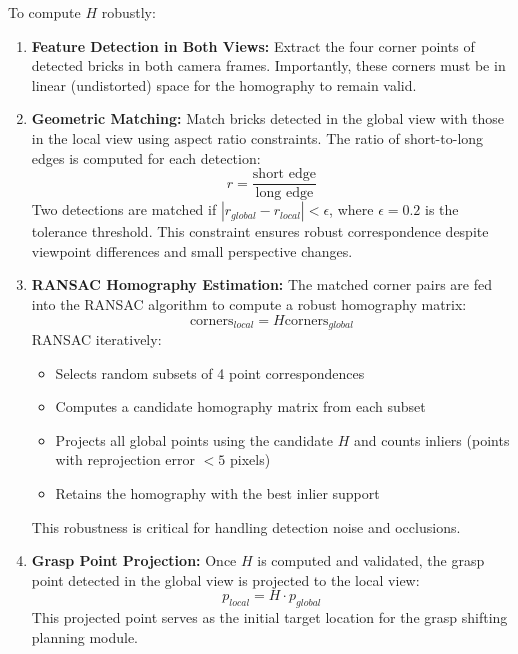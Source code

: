 To compute $H$ robustly:

\begin{enumerate}
    \item \textbf{Feature Detection in Both Views:} Extract the four corner points of detected bricks in both camera frames. Importantly, these corners must be in linear (undistorted) space for the homography to remain valid.
    
    \item \textbf{Geometric Matching:} Match bricks detected in the global view with those in the local view using aspect ratio constraints. The ratio of short-to-long edges is computed for each detection:
    \begin{equation}
        r = \frac{\text{short edge}}{\text{long edge}}
    \end{equation}
    Two detections are matched if $|r_{global} - r_{local}| < \epsilon$, where $\epsilon = 0.2$ is the tolerance threshold. This constraint ensures robust correspondence despite viewpoint differences and small perspective changes.
    
    \item \textbf{RANSAC Homography Estimation:} The matched corner pairs are fed into the RANSAC algorithm to compute a robust homography matrix:
    \begin{equation}
        \text{corners}_{local} = H \text{corners}_{global}
    \end{equation}
    RANSAC iteratively:
    \begin{itemize}
        \item Selects random subsets of 4 point correspondences
        \item Computes a candidate homography matrix from each subset
        \item Projects all global points using the candidate $H$ and counts inliers (points with reprojection error $< 5$ pixels)
        \item Retains the homography with the best inlier support
    \end{itemize}
    
    This robustness is critical for handling detection noise and occlusions.
    
    \item \textbf{Grasp Point Projection:} Once $H$ is computed and validated, the grasp point detected in the global view is projected to the local view:
    \begin{equation}
        p_{local} = H \cdot p_{global}
    \end{equation}
    This projected point serves as the initial target location for the grasp shifting planning module.
\end{enumerate}

